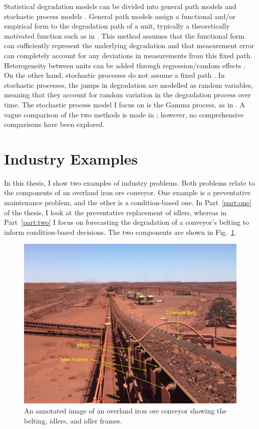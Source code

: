 Statistical degradation models can be divided into general path models and stochastic process models \citep{pandey2006, si2011}. General path models assign a functional and/or empirical form to the degradation path of a unit, typically a theoretically motivated function such as in \citet{robinson2000}. This method assumes that the functional form can sufficiently represent the underlying degradation and that measurement error can completely account for any deviations in measurements from this fixed path. Heterogeneity between units can be added through regression/random effects \citep{robinson2000}. On the other hand, stochastic processes do not assume a fixed path \citep{pandey2006}. In stochastic processes, the jumps in degradation are modelled as random variables, meaning that they account for random variation in the degradation process over time. The stochastic process model I focus on is the Gamma process, as in \citet{lawless2004}. A vague comparison of the two methods is made in \citet{ye2015}; however, no comprehensive comparisons have been explored.

\section{Industry Examples}
\label{sec:industry-data}

In this thesis, I show two examples of industry problems. Both problems relate to the components of an overland iron ore conveyor. One example is a preventative maintenance problem, and the other is a condition-based one. In Part~\ref{part:one} of the thesis, I look at the preventative replacement of idlers, whereas in Part~\ref{part:two} I focus on forecasting the degradation of a conveyor's belting to inform condition-based decisions. The two components are shown in Fig.~\ref{fig:belt_and_frame}.

\begin{figure}
  \centering
  \includegraphics[width=1\textwidth]{./figures/ch-1/cvr_example_edit_annotation.jpg}
  \caption{An annotated image of an overland iron ore conveyor \citep{australianmining2020} showing the belting, idlers, and idler frames.}
  \label{fig:belt_and_frame}
\end{figure}

